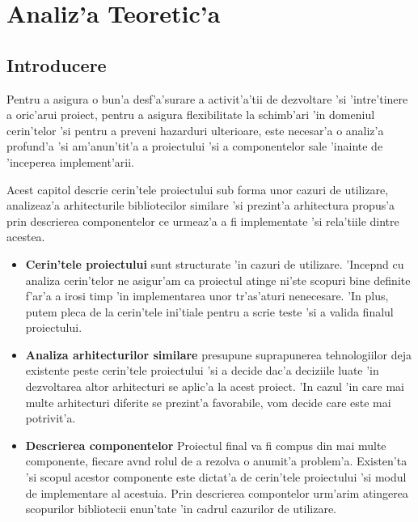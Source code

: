 \chapter{Analiz'a Teoretic'a}
%
\section{Introducere}
%
%

Pentru a asigura o bun'a desf'a'surare a activit'a'tii de dezvoltare 'si 'intre'tinere a oric'arui proiect, pentru a asigura flexibilitate la schimb'ari 'in domeniul cerin'telor 'si pentru a preveni hazarduri ulterioare, este necesar'a o analiz'a profund'a 'si am'anun'tit'a a proiectului 'si a componentelor sale 'inainte de 'inceperea implement'arii.

\medskip

Acest capitol descrie cerin'tele proiectului sub forma unor cazuri de utilizare, analizeaz'a arhitecturile bibliotecilor similare 'si prezint'a arhitectura propus'a prin descrierea componentelor ce urmeaz'a a fi implementate 'si rela'tiile dintre acestea.

\begin{itemize}
\item {\bf Cerin'tele proiectului} sunt structurate 'in cazuri de utilizare. 'Incep{\ia}nd cu analiza cerin'telor ne asigur'am ca proiectul atinge ni'ste scopuri bine definite f'ar'a a irosi timp 'in implementarea unor tr'as'aturi nenecesare. 'In plus, putem pleca de la cerin'tele ini'tiale pentru a scrie teste 'si a valida finalul proiectului.

\item {\bf Analiza arhitecturilor similare} presupune suprapunerea tehnologiilor deja existente peste cerin'tele proiectului 'si a decide dac'a deciziile luate 'in dezvoltarea altor arhitecturi se aplic'a la acest proiect. 'In cazul 'in care mai multe arhitecturi diferite se prezint'a favorabile, vom decide care este mai potrivit'a.

\item {\bf Descrierea componentelor} Proiectul final va fi compus din mai multe componente, fiecare av{\ia}nd rolul de a rezolva o anumit'a problem'a. Existen'ta 'si scopul acestor componente este dictat'a de cerin'tele proiectului 'si modul de implementare al acestuia. Prin descrierea compontelor urm'arim atingerea scopurilor bibliotecii enun'tate 'in cadrul cazurilor de utilizare.


\end{itemize}

